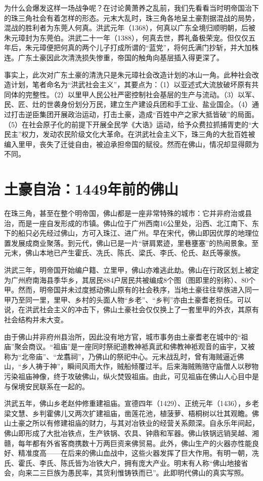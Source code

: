 为什么会爆发这样一场战争呢？在讨论黄萧养之乱前，我们先看看当时明帝国治下的珠三角社会有着怎样的形态。元末大乱时，珠三角各地呈土豪割据混战的局势，混战的胜利者为东莞人何真。洪武元年（1368），何真以广东全境归顺明朝，后被朱元璋封为东莞伯。洪武二十一年（1388），何真去世，葬礼备极荣宠。但仅仅五年后，朱元璋便把何真的两个儿子打成所谓的“蓝党”，将何氏满门抄斩，并大加株连。广东土豪因此次清洗损失惨重，帝国的触角向基层插入得更深了。

事实上，此次对广东土豪的清洗只是朱元璋社会改造计划的冰山一角。此种社会改造计划，笔者命名为“洪武社会主义”，其要点为：（1）以亚述式大流放破坏原有共同体的完整性。（2）以里甲人民公社严密控制社会基层的生产与流动。（3）以军、民、匠、灶的世袭身份划分万民，建立生产建设兵团和手工业、盐业国企。（4）通过打击逆臣集团开展政治运动，打击土豪，造成“百姓中产之家大抵皆破”的局面。（5）在社会原子化的前提下开展全民学《大诰》运动，给予众费拉抓捕胥吏的“大民主”权力，发动农民阶级文化大革命。在洪武社会主义下，珠三角的大批百姓被编入里甲，丧失了迁徙自由，被迫承担帝国的赋役。然而在佛山，情况却显得颇为不同。

\section*{土豪自治：1449年前的佛山}

在珠三角，甚至在整个明帝国，佛山都是一座非常特殊的城市：它并非府治或县治，而是一座自发形成的市镇。佛山位于广州西南16公里处，沿西、北江南下、东下的船只必先经过佛山，方可入珠江、进广州。早在宋代，佛山即因优厚的地理位置发展成商业聚落。到元代，佛山已是一片“骈肩累迹，里巷壅塞”的热闹景象。至元末，佛山本地已产生霍氏、冼氏、陈氏、梁氏、李氏、伦氏、赵氏等豪族。

洪武三年，明帝国开始编户籍、立里甲，佛山亦难逃此劫。佛山在行政区划上被定为广州府南海县季华乡，其居民884户居民共被编成8个图（图即里的别称）、80个甲。然而，明帝国并未过度撼动佛山原有的社会秩序，当地土豪往往举族进入同一甲乃至同一里，里甲、乡村的头面人物“乡老”、“乡判”亦由土豪耆老担任。可以说，在洪武社会主义的冲击下，佛山土豪社会仅仅换上了一套里甲的外衣，其原有社会结构并未大变。

由于佛山并非府州县治所，因此没有地方官，城市事务由土豪耆老在城中的“祖庙”聚会商议。“祖庙”是一座同时祭祀道教神袛真武和佛教神袛观音的庙宇，又被称为“北帝庙”、“龙翥祠”，乃佛山的祭祀中心。元末战乱时，曾有海贼逼近佛山，“乡人祷于神”，瞬间风雨大作，贼船倾覆过半。后来海贼贿赂守庙僧人以秽物污染祖庙神像，终于攻破佛山，纵火焚毁祖庙。由此，可见祖庙在佛山人心目中是与保境安民联系在一起的。

洪武五年，佛山乡老赵仲修重建祖庙。宣德四年（1429）、正统元年（1436），乡老梁文慧、乡判霍佛儿又两次扩建祖庙，凿莲花池，植菠萝、梧桐树以壮其观瞻。佛山土豪之所以有修建祖庙的财力，与其对冶铁业的经营关系颇深。自永乐年间起，佛山即形成了大批冶铁点，生产铁锅、农具、钟鼎和军器。佛山铁锅远销吴越、湘赣，每年都有外省客商携数十万两巨资来佛贸易。此外，佛山生产的火器亦性能良好、精准度高——在后来的佛山血战中，这些火器发挥了巨大作用。有明一朝，冼氏、霍氏、李氏、陈氏皆为冶铁大户，拥有庞大产业。明末有人称“佛山地接省会，向来二三巨族为愚民率，其货利惟铸铁而已”。此即明代佛山的真实写照。

